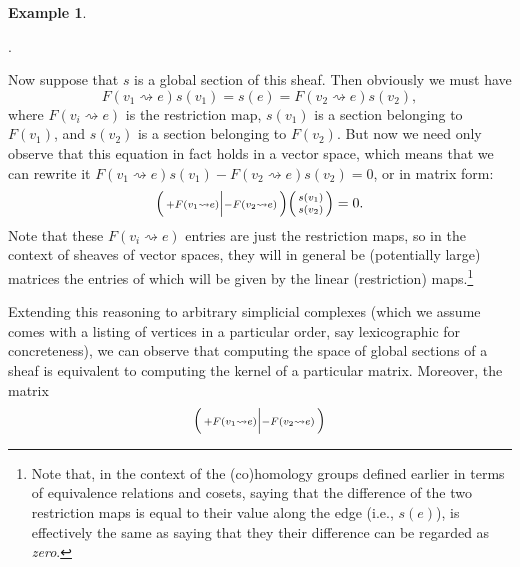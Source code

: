 \documentclass[11pt]{book}
\theoremstyle{definition}
\newtheorem{example}{Example}[section]
\theoremstyle{definition}
\theoremstyle{definition}
\theoremstyle{theorem}
\theoremstyle{definition}
\begin{document}
\begin{example}
\begin{center}
.
 \end{center} 
 Now suppose that $s$ is a global section of this sheaf. Then obviously we must have 
 \begin{equation}
 F(v_1 \rightsquigarrow e) s(v_1) = s(e) = F(v_2 \rightsquigarrow e) s(v_2),
 \end{equation}
 where $F(v_i \rightsquigarrow e)$ is the restriction map, $s(v_1)$ is a section belonging to $F(v_1)$, and $s(v_2)$ is a section belonging to $F(v_2)$. But now we need only observe that this equation in fact holds in a vector space, which means that we can rewrite it $F(v_1 \rightsquigarrow e) s(v_1) - F(v_2 \rightsquigarrow e) s(v_2) = 0$, or in matrix form: 
 \begin{equation}
 \begin{psmallmatrix}
 +F(v_1 \rightsquigarrow e) \Big| - F(v_2 \rightsquigarrow e) \end{psmallmatrix} \begin{psmallmatrix}
 s(v_1) \\ s(v_2)
 \end{psmallmatrix} = 0.
 \end{equation} 
 Note that these $F(v_i \rightsquigarrow e)$ entries are just the restriction maps, so in the context of sheaves of vector spaces, they will in general be (potentially large) matrices the entries of which will be given by the linear (restriction) maps.\footnote{Note that, in the context of the (co)homology groups defined earlier in terms of equivalence relations and cosets, saying that the difference of the two restriction maps is equal to their value along the edge (i.e., $s(e)$), is effectively the same as saying that they their difference can be regarded as \textit{zero}.}\par 
 Extending this reasoning to arbitrary simplicial complexes (which we assume comes with a listing of vertices in a particular order, say lexicographic for concreteness), we can observe that computing the space of global sections of a sheaf is equivalent to computing the kernel of a particular matrix. Moreover, the matrix 
  \begin{equation*}
  \begin{psmallmatrix}
  +F(v_1 \rightsquigarrow e) \Big| - F(v_2 \rightsquigarrow e) \end{psmallmatrix}

\end{equation*}
\end{example}
\end{document}
